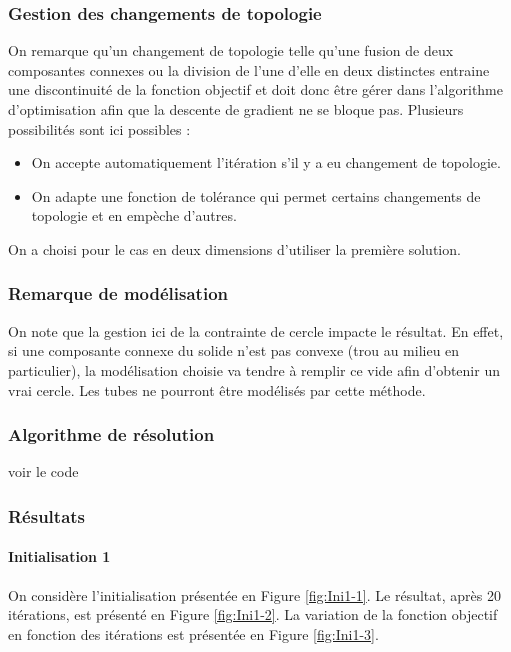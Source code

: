 \documentclass[11pt,a4paper]{article}
\begin{document}
\subsubsection{Gestion des changements de topologie}
On remarque qu'un changement de topologie telle qu'une fusion de deux composantes connexes ou la division de l'une d'elle en deux distinctes entraine une discontinuité de la fonction objectif et doit donc être gérer dans l'algorithme d'optimisation afin que la descente de gradient ne se bloque pas. Plusieurs possibilités sont ici possibles :

\begin{itemize}
	\item On accepte automatiquement l'itération s'il y a eu changement de topologie.
	\item On adapte une fonction de tolérance qui permet certains changements de topologie et en empèche d'autres. 
\end{itemize}

On a choisi pour le cas en deux dimensions d'utiliser la première solution.

\subsubsection{Remarque de modélisation}
On note que la gestion ici de la contrainte de cercle impacte le résultat. En effet, si une composante connexe du solide n'est pas convexe (trou au milieu en particulier), la modélisation choisie va tendre à remplir ce vide afin d'obtenir un vrai cercle. Les tubes ne pourront être modélisés par cette méthode.

\subsubsection{Algorithme de résolution}
 voir le code
 

\subsubsection{Résultats}
\paragraph{Initialisation 1}

\vspace{0cm}

On considère l'initialisation présentée en Figure \ref{fig:Ini1-1}. Le résultat, après 20 itérations, est présenté en Figure \ref{fig:Ini1-2}. La variation de la fonction objectif en fonction des itérations est présentée en Figure \ref{fig:Ini1-3}.
\end{document}
